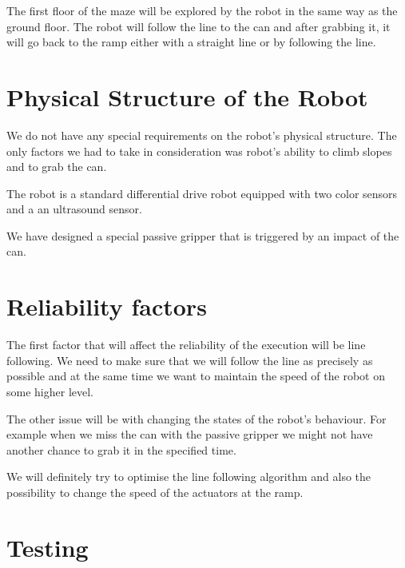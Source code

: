 \documentclass{article}
\begin{document}
The first floor of the maze will be explored by the robot in the same way as the ground floor. The robot will follow the
line to the can and after grabbing it, it will go back to the ramp either with a straight line or by following the line.


\section{Physical Structure of the Robot}

We do not have any special requirements on the robot's physical structure. The only factors we had to take in
consideration was robot's ability to climb slopes and to grab the can.

The robot is a standard differential drive robot equipped with two color sensors and a an ultrasound sensor.

We have designed a special passive gripper that is triggered by an impact of the can.

\section{Reliability factors}

The first factor that will affect the reliability of the execution will be line following. We need to make sure that we
will follow the line as precisely as possible and at the same time we want to maintain the speed of the robot on some
higher level.

The other issue will be with changing the states of the robot's behaviour. For example when we miss the can with the passive gripper
we might not have another chance to grab it in the specified time.

We will definitely try to optimise the line following algorithm and also the possibility to change the speed of the
actuators at the ramp.

\section{Testing}
\end{document}
